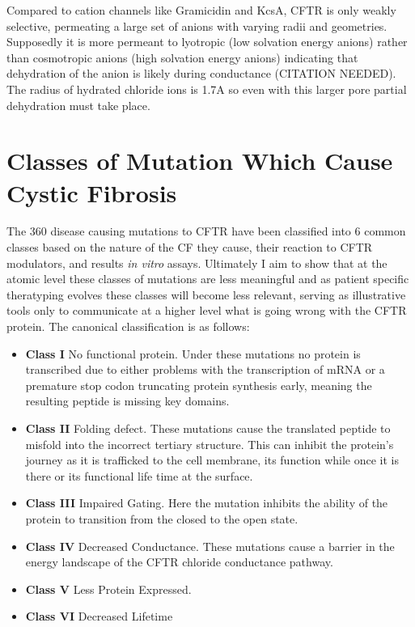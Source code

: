 Compared to cation channels like Gramicidin and KcsA, CFTR is only weakly selective, permeating a large set of anions with varying radii and geometries. Supposedly it is more permeant to lyotropic (low solvation energy anions) rather than cosmotropic anions (high solvation energy anions) indicating that dehydration of the anion is likely during conductance (CITATION NEEDED). The radius of hydrated chloride ions is 1.7A\cite{yang2002} so even with this larger pore partial dehydration must take place. 


\section{Classes of Mutation Which Cause Cystic Fibrosis}
The 360 disease causing mutations to CFTR have been classified into 6 common classes based on the nature of the CF they cause, their reaction to CFTR modulators, and results \textit{in vitro} assays. Ultimately I aim to show that at the atomic level these classes of mutations are less meaningful and as patient specific theratyping evolves these classes will become less relevant, serving as illustrative tools only to communicate at a higher level what is going wrong with the CFTR protein. The canonical classification is as follows:
\begin{itemize}
	\item \textbf{Class I} No functional protein. Under these mutations no protein is transcribed due to either problems with the transcription of mRNA or a premature stop codon truncating protein synthesis early, meaning the resulting peptide is missing key domains. 
	\item \textbf{Class II} Folding defect. These mutations cause the translated peptide to misfold into the incorrect tertiary structure. This can inhibit the protein's journey as it is trafficked to the cell membrane, its function while once it is there or its functional life time at the surface. 
	\item \textbf{Class III} Impaired Gating. Here the mutation inhibits the ability of the protein to transition from the closed to the open state. 
	\item \textbf{Class IV} Decreased Conductance. These mutations cause a barrier in the energy landscape of the CFTR chloride conductance pathway.
	\item \textbf{Class V} Less Protein Expressed.  
	\item \textbf{Class VI} Decreased Lifetime

\end{itemize}

